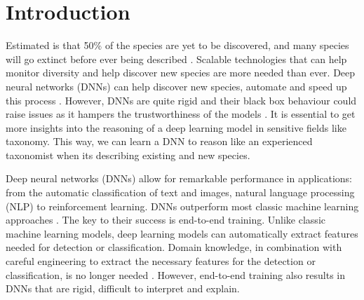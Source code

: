 \documentclass[a4paper, 12pt, oneside]{book} %
\begin{document}
\section{Introduction}
Estimated is that 50\% of the species are yet to be discovered, and many species will go extinct before ever being described \autocite{lees_species_2015}.
Scalable technologies that can help monitor diversity and help discover new species are more needed than ever.
Deep neural networks (DNNs) can help discover new species, automate and speed up this process \autocite{van_horn_inaturalist_2018}.
However, DNNs are quite rigid and their black box behaviour could raise issues as it hampers the trustworthiness of the models \autocite{carvalho_machine_2019}.
It is essential to get more insights into the reasoning of a deep learning model in sensitive fields like taxonomy.
This way, we can learn a DNN to reason like an experienced taxonomist when its describing existing and new species.

Deep neural networks (DNNs) allow for remarkable performance in applications: from the automatic classification of text and images, natural language processing (NLP) to reinforcement learning.
DNNs outperform most classic machine learning approaches \autocite{he_delving_2015, brown_language_2020}.
The key to their success is end-to-end training.
Unlike classic machine learning models, deep learning models can automatically extract features needed for detection or classification.
Domain knowledge, in combination with careful engineering to extract the necessary features for the detection or classification, is no longer needed \autocite{lecun_deep_2015}.
However, end-to-end training also results in DNNs that are rigid, difficult to interpret and explain.

\end{document}
